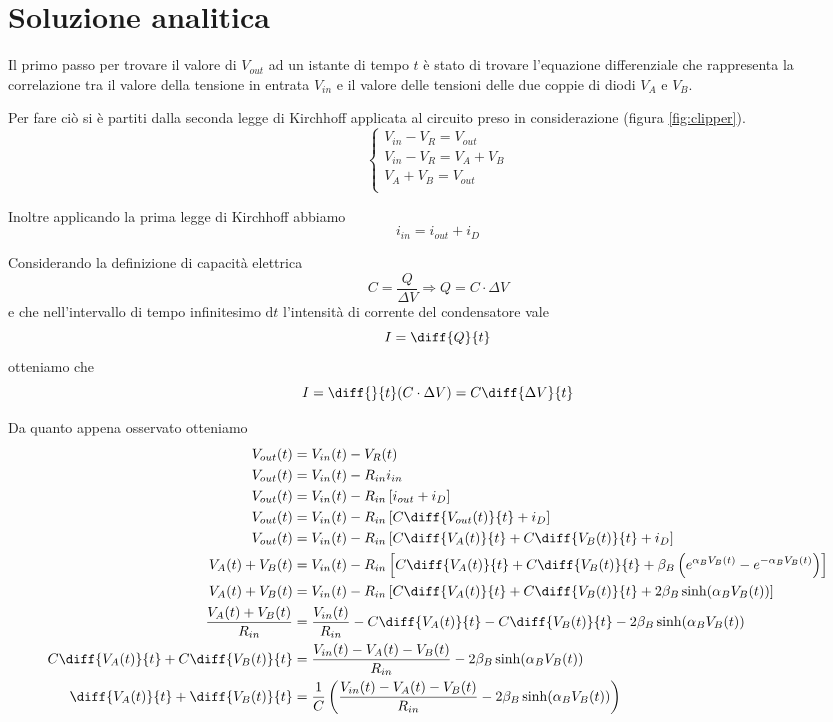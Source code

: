\raggedbottom
\chapter{Soluzione analitica}
	Il primo passo per trovare il valore di $V_{out}$ ad un istante di tempo $t$ è stato di trovare l'equazione differenziale che rappresenta la correlazione tra il valore della tensione in entrata $V_{in}$ e il valore delle tensioni delle due coppie di diodi $V_{A}$ e $V_{B}$.
	
	Per fare ciò si è partiti dalla seconda legge di Kirchhoff applicata al circuito preso in considerazione (figura \ref{fig:clipper}).
	\[
	\begin{cases}
		V_{in}-V_{R} = V_{out}\\
		V_{in}-V_{R} = V_{A}+V_{B}\\
		V_{A}+V_{B} = V_{out}\\
	\end{cases}
	\]
	
	Inoltre applicando la prima legge di Kirchhoff abbiamo
	\[
		i_{in} = i_{out}+i_{D}
	\]
	
	Considerando la definizione di capacità elettrica
	\[
		C = \frac{Q}{\Delta V} \Rightarrow Q = C \cdot \Delta V
	\]
	e che nell'intervallo di tempo infinitesimo $\mathrm{d}t$ l'intensità di corrente del condensatore vale 
	\[
		I = \diff{Q}{t}
	\]
	otteniamo che
	\[
		I = \diff{}{t}(C \cdot \Delta V) = C\diff{\Delta V}{t}
	\]
	
	\vspace{20px}
	Da quanto appena osservato otteniamo
	\begin{equation}
		\label{eq:differenziale}
		\begin{split}
			V_{out}(t) &= V_{in}(t)-V_{R}(t)\\
			V_{out}(t) &= V_{in}(t)-R_{in}i_{in}\\
			V_{out}(t) &= V_{in}(t)-R_{in}\left[i_{out}+i_{D}\right]\\
			V_{out}(t) &= V_{in}(t)-R_{in}\left[C\diff{V_{out}(t)}{t}+i_{D}\right]\\
			V_{out}(t) &= V_{in}(t)-R_{in}\left[C\diff{V_{A}(t)}{t}+C\diff{V_{B}(t)}{t}+i_{D}\right]\\
			V_{A}(t)+V_{B}(t) &= V_{in}(t)-R_{in}\left[C\diff{V_{A}(t)}{t}+C\diff{V_{B}(t)}{t}+\beta_{B}\left(e^{\alpha_{B}V_{B}(t)}-e^{-\alpha_{B}V_{B}(t)}\right)\right]\\
			V_{A}(t)+V_{B}(t) &= V_{in}(t)-R_{in}\left[C\diff{V_{A}(t)}{t}+C\diff{V_{B}(t)}{t}+2\beta_{B}\sinh(\alpha_{B}V_{B}(t))\right]\\
			\frac{V_{A}(t)+V_{B}(t)}{R_{in}} &= \frac{V_{in}(t)}{R_{in}}-C\diff{V_{A}(t)}{t}-C\diff{V_{B}(t)}{t}-2\beta_{B}\sinh(\alpha_{B}V_{B}(t))\\
			C\diff{V_{A}(t)}{t}+C\diff{V_{B}(t)}{t} &= \frac{V_{in}(t)-V_{A}(t)-V_{B}(t)}{R_{in}}-2\beta_{B}\sinh(\alpha_{B}V_{B}(t))\\
			\diff{V_{A}(t)}{t}+\diff{V_{B}(t)}{t} &= \frac{1}{C}\left(\frac{V_{in}(t)-V_{A}(t)-V_{B}(t)}{R_{in}}-2\beta_{B}\sinh(\alpha_{B}V_{B}(t))\right)\\
		\end{split}
	\end{equation}
	\pagebreak
	
